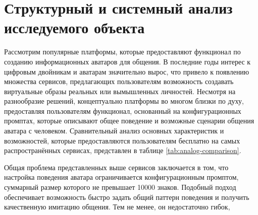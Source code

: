 \chapter{Структурный и системный анализ исследуемого объекта}

Рассмотрим популярные платформы, которые предоставляют функционал по созданию 
информационных аватаров для общения. В последние годы интерес к цифровым двойникам и 
аватарам значительно вырос, что привело к появлению множества сервисов, предлагающих 
пользователям возможность создавать виртуальные образы реальных или вымышленных личностей. 
Несмотря на разнообразие решений, концептуально платформы во многом близки по духу, 
предоставляя пользователям функционал, основанный на конфигурационных промптах, которые 
описывают общее поведение и возможные сценарии общения аватара с человеком. Сравнительный 
анализ основных характеристик и возможностей, которые предоставляются пользователям 
бесплатно на самых распространённых сервисах, представлен в таблице \ref{tab:analog-comparison}.


\begin{table}[htbp]
\centering
\caption{Сравнение сервисов для работы с аватарами}
\label{tab:analog-comparison}
\end{table}


Общая проблема представленных выше сервисов заключается в том, что настройка поведения 
аватара ограничивается конфигурационным промптом, суммарный размер которого не превышает 
10000 знаков. Подобный подход обеспечивает возможность быстро задать общий паттерн 
поведения и получить качественную имитацию общения. Тем не менее, он недостаточно гибок, 

